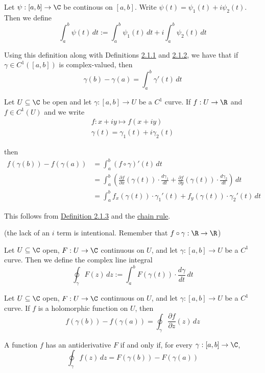 Let $\psi:[a,b]\to\C$ be continous on $[a,b]$. Write
$\psi(t)=\psi_1(t)+i\psi_2(t)$. Then we define
$$
  \int_a^b\psi(t)\,dt:=\int_a^b\psi_1(t)\,dt+i\int_a^b\psi_2(t)\,dt
$$

Using this definition along with Definitions \href{c1f6d35}{2.1.1} and
\href{e4132bc}{2.1.2}, we have that if $\gamma\in C^1([a,b])$ is
complex-valued, then
$$
  \gamma(b)-\gamma(a)=\int_a^b\gamma'(t)\,dt
$$

\label{f37b676}

Let $U\subseteq\C$ be open and let $\gamma:[a,b]\to U$ be a $C^1$ curve. If
$f:U\to\R$ and $f\in C^1(U)$ and we write
\begin{gather*}
  f:x+iy\mapsto f(x+iy) \\
  \gamma(t)=\gamma_1(t)+i\gamma_2(t)
\end{gather*}

then
\begin{align*}
  f(\gamma(b))-f(\gamma(a))
   &=\int_a^b (f\circ\gamma)'(t)\,dt \\
   &=\int_a^b\left(
  \frac{\partial f}{\partial x}(\gamma(t))\cdot\frac{d\gamma_1}{dt}+
  \frac{\partial f}{\partial y}(\gamma(t))\cdot\frac{d\gamma_2}{dt}
  \right)\,dt                        \\
   &=\int_a^b
  f_x(\gamma(t))\cdot\gamma_1'(t)+f_y(\gamma(t))\cdot\gamma_2'(t)
  \,dt
\end{align*}

This follows from \href{c511702}{Definition 2.1.3} and the \href{d969d46}{chain
rule}.

(the lack of an $i$ term is intentional. Remember that
$f\circ\gamma:\R\to\R$)

\label{b1e96fc}

Let $U\subseteq\C$ open, $F:U\to\C$ continuous on $U$, and let $\gamma:[a,b]\to
U$ be a $C^1$ curve. Then we define the complex line integral
$$
  \oint_\gamma F(z)\,dz:=\int_a^bF(\gamma(t))\cdot\frac{d\gamma}{dt}\,dt
$$

\label{c526c09}

Let $U\subseteq\C$ open, $F:U\to\C$ continuous on $U$, and let $\gamma:[a,b]\to
U$ be a $C^1$ curve. If $f$ is a holomorphic function on $U$, then
$$
  f(\gamma(b))-f(\gamma(a))=\oint_\gamma\frac{\partial f}{\partial z}(z)\,dz
$$

\label{cf21af2}

A function $f$ has an antiderivative $F$ if and only if, for every
$\gamma:[a,b]\to\C$,
$$
  \oint_\gamma f(z)\,dz=F(\gamma(b))-F(\gamma(a))
$$

